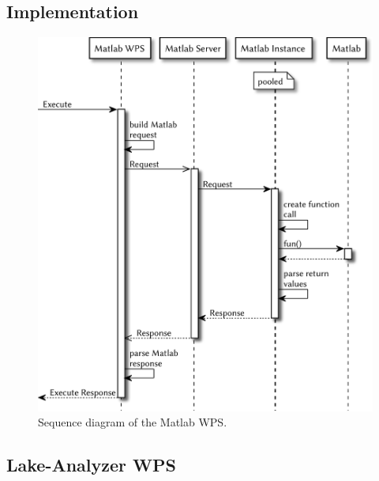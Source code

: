 	\subsection{Implementation}
	\begin{figure}[!htb]
		\centering
		\includegraphics[width=.8\textwidth]{figures/sequence-diagramm-mwps.pdf}
		\caption{\label{fig:sd:mwps} Sequence diagram of the Matlab WPS.} %
	\end{figure}
	\subsection{Lake-Analyzer WPS}
